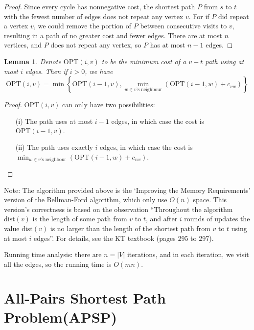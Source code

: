 \documentclass[11pt]{article}
\theoremstyle{plain}
\newtheorem{lemma}{Lemma}[section]
\begin{document}
  \begin{proof}
    Since every cycle has nonnegative cost, the shortest path $P$ from $s$ to
    $t$ with the fewest number of edges does not repeat any vertex $v$. For if $P$ did
    repeat a vertex $v$, we could remove the portion of $P$ between consecutive visits
    to $v$, resulting in a path of no greater cost and fewer edges. There are at most 
    $n$ vertices, and $P$ does not repeat any vertex, so $P$ has at most $n-1$ edges.
  \end{proof}

  \begin{lemma}
    Denote $\text{OPT}(i, v)$ to be the minimum cost of a $v-t$ path using at most
    $i$ edges. Then if $i > 0$, we have
    \[
      \text{OPT}(i, v) =\min\left\{ \text{OPT}(i-1, v),\min_{w \in v\text{'s neighbour}}(\text{OPT}(i-1, w) + c_{vw}) \right\} 
    \]
  \end{lemma}

  \begin{proof}
    $\text{OPT}(i, v)$ can only have two possibilities: 
    \begin{itemize}
      \item[(i)] The path uses at most $i-1$ edges, in which case the cost is $\text{OPT}(i-1, v)$.
      \item[(ii)] The path uses exactly $i$ edges, in which case the cost is $\min_{w \in v\text{'s neighbour}}(\text{OPT}(i-1, w) + c_{vw})$.
    \end{itemize}
  \end{proof}

  Note: The algorithm provided above is the `Improving the Memory Requirements' version of the Bellman-Ford algorithm, 
  which only use $O(n)$ space. This version's correctness is based on the observation ``Throughout the algorithm $\text{dist}(v)$ 
  is the length of some path from $v$ to $t$, and after $i$ rounds of updates the value $\text{dist}(v)$ is no larger than the length of
  the shortest path from $v$ to $t$ using at most $i$ edges''. For details, see the KT textbook (pages 295 to 297).

  Running time analysis: there are $n = |V|$ iterations, and in each iteration, we visit all the edges, so the running time is $O(mn)$.

\section{All-Pairs Shortest Path Problem(APSP)}
\end{document}

